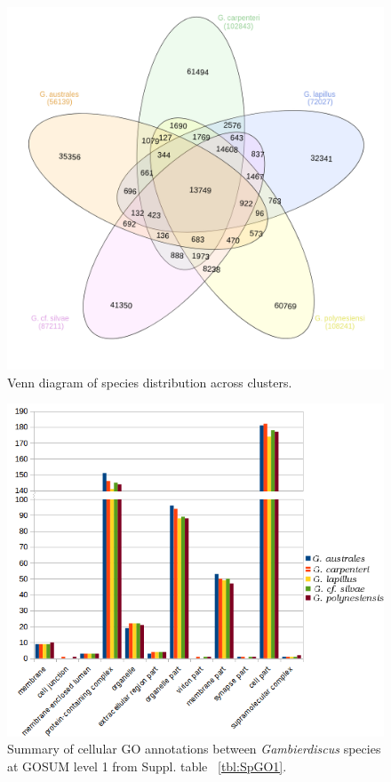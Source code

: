 \documentclass[12pt]{article}
\begin{document}
\begin{figure} 
\includegraphics[scale=.4]{3Aug18_cluster-investigation/Species-venn.png} 
\caption{Venn diagram of species distribution across clusters.} 
\label{fig:SpeciesVenn}
\end{figure} 
\FloatBarrier

\begin{figure} 
\includegraphics[scale=.9]{3Aug18_cluster-investigation/figures/gosum-species/Species-gosum1-cell-split.png} 
\caption{Summary of cellular GO annotations between \textit{Gambierdiscus} species at GOSUM level 1 from Suppl. table ~\ref{tbl:SpGO1}.} 
\label{fig:SpecGo1Cell}
\end{figure} 
\FloatBarrier
\end{document}
